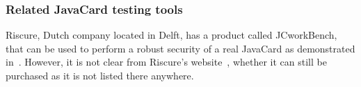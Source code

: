 \documentclass{../llncs/llncs}
\begin{document}



\subsubsection{Related JavaCard testing tools}
Riscure, Dutch company located in Delft, has a product called JCworkBench, that can be used to perform a robust security of a real JavaCard as demonstrated in~\cite{jcworkbench,riscurejcworkbenchpdf}. However, it is not clear from Riscure's website~\cite{riscureweb}, whether it can still be purchased as it is not listed there anywhere.\footnotemark
\end{document}
